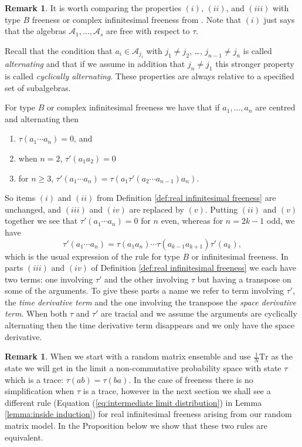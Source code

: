 \documentclass[11pt]{amsart}
\theoremstyle{definition}
\newtheorem{remark}[theorem]{Remark}
\numberwithin{theorem}{section}
\newcommand{\cA}{\mathcal{A}}
\newcommand{\sN}{{\scriptscriptstyle N}}
\newcommand{\sone}{{\scriptscriptstyle 1}}
\newcommand{\Tr}{\mathrm{Tr}}
\begin{document}
\begin{remark}\label{remark:comparison}
It is worth comparing the properties $(i)$, $(ii)$, and
$(iii)$ with type $B$ freeness or complex infinitesimal
freeness from \cite{fn}. Note that $(i)$ just says that the
algebras $\cA_1, \dots, \cA_s$ are free with respect to
$\tau$.

Recall that the condition that $a_i \in \cA_{j_i}$ with $j_1
\not= j_2$, \dots, $j_{n-1} \not= j_n$ is called
\textit{alternating} and that if we assume in addition that
$j_n \not = j_1$ this stronger property is called
\textit{cyclically alternating}. These properties are always
relative to a specified set of subalgebras.

For type $B$ or complex infinitesimal freeness we have that
if $a_1, \dots, a_n$ are centred and alternating then
\begin{enumerate}

\item\smallskip
$\tau(a_1 \cdots a_n) = 0$, and

\item[$(ii)$]\smallskip
when $n = 2$, $\tau'(a_1 a_2) = 0$  

\item[$(v)$]\smallskip
for $n \geq 3$, $\tau'(a_1 \cdots a_n) = \tau(a_1\tau'(a_2 \cdots a_{n-1})a_n)$.
\end{enumerate}
So items $(i)$ and $(ii)$ from Definition \ref{def:real
  infinitesimal freeness} are unchanged, and $(iii)$ and
$(iv)$ are replaced by $(v)$. Putting $(ii)$ and $(v)$
together we see that $\tau'(a_1 \cdots a_n) = 0$ for $n$
even, whereas for $n = 2k -1 $ odd, we have
\[
\tau'(a_1 \cdots a_n) = \tau(a_1a_n)\cdots \tau(a_{k-1}a_{k+1}) \tau'(a_k), 
\]
which is the usual expression of the rule for type $B$ or
infinitesimal freeness. In parts $(iii)$ and $(iv)$ of
Definition \ref{def:real infinitesimal freeness} we each
have two terms: one involving $\tau'$ and the other
involving $\tau$ but having a transpose on some of the
arguments. To give these parts a name we refer to term
involving $\tau'$, the \textit{time derivative term} and the
one involving the transpose the \textit{space derivative
  term}. When both $\tau$ and $\tau'$ are tracial and we
assume the arguments are cyclically alternating then the
time derivative term disappears and we only have the space
derivative.


\end{remark}

\begin{remark}
When we start with a random matrix ensemble and use
$\frac{\sone}{\sN}\Tr$ as the state we will get in the limit
a non-commutative probability space with state $\tau$ which
is a trace: $\tau(ab) = \tau(ba)$. In the case of freeness
there is no simplification when $\tau$ is a trace, however
in the next section we shall see a different rule (Equation
(\ref{eq:intermediate limit distribution}) in Lemma
\ref{lemma:inside induction}) for real infinitesimal
freeness arising from our random matrix model.  In the
Proposition below we show that these two rules are
equivalent.
\end{remark}
\end{document}
